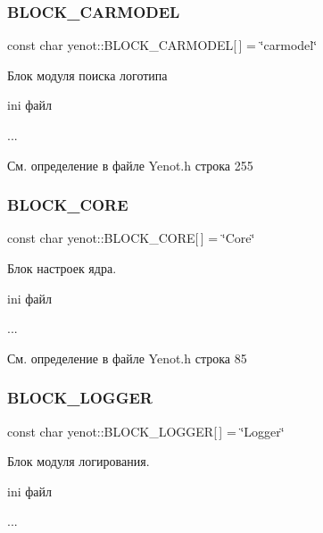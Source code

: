 \subsubsection{\texorpdfstring{B\+L\+O\+C\+K\+\_\+\+C\+A\+R\+M\+O\+D\+EL}{BLOCK\_CARMODEL}}
{\footnotesize\ttfamily const char yenot\+::\+B\+L\+O\+C\+K\+\_\+\+C\+A\+R\+M\+O\+D\+EL\mbox{[}$\,$\mbox{]} = \char`\"{}carmodel\char`\"{}}

Блок модуля поиска логотипа

ini файл 
\begin{DoxyCode}
[carmodel]
...
\end{DoxyCode}
 

См. определение в файле Yenot.\+h строка 255

\mbox{\label{namespaceyenot_a2172a9f506029215b790a51a4023e1ac}} 
\subsubsection{\texorpdfstring{B\+L\+O\+C\+K\+\_\+\+C\+O\+RE}{BLOCK\_CORE}}
{\footnotesize\ttfamily const char yenot\+::\+B\+L\+O\+C\+K\+\_\+\+C\+O\+RE\mbox{[}$\,$\mbox{]} = \char`\"{}Core\char`\"{}}

Блок настроек ядра.

ini файл 
\begin{DoxyCode}
[Core]
...
\end{DoxyCode}
 

См. определение в файле Yenot.\+h строка 85

\mbox{\label{namespaceyenot_a73be0cdcde2af378cd4043f56d4776e2}} 
\subsubsection{\texorpdfstring{B\+L\+O\+C\+K\+\_\+\+L\+O\+G\+G\+ER}{BLOCK\_LOGGER}}
{\footnotesize\ttfamily const char yenot\+::\+B\+L\+O\+C\+K\+\_\+\+L\+O\+G\+G\+ER\mbox{[}$\,$\mbox{]} = \char`\"{}Logger\char`\"{}}

Блок модуля логирования.

ini файл 
\begin{DoxyCode}
[Logger]
...
\end{DoxyCode}
 

